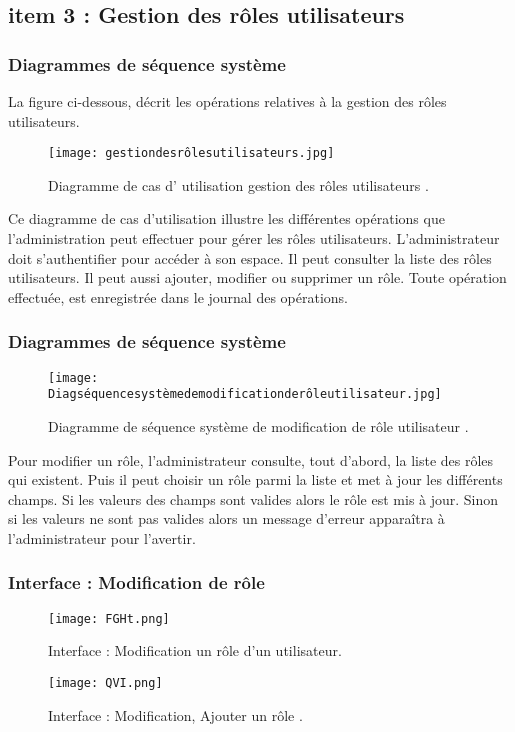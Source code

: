 \subsection{item 3 : Gestion des rôles utilisateurs}
\subsubsection{Diagrammes de séquence système }

La figure ci-dessous, décrit les opérations relatives à la gestion des rôles utilisateurs.
\begin{figure}[ht]
	\centering
	\texttt{[image: gestiondesrôlesutilisateurs.jpg]}
	\caption{Diagramme de cas d' utilisation gestion des rôles utilisateurs .}
	\label{fig:Diagramme de cas d utilisation gestion des rôles utilisateurs }
\end{figure}
\FloatBarrier
Ce diagramme de cas d’utilisation illustre les différentes opérations que l’administration peut effectuer pour gérer les rôles utilisateurs. L’administrateur doit s’authentifier
pour accéder à son espace. Il peut consulter la liste des rôles utilisateurs. Il peut aussi
ajouter, modifier ou supprimer un rôle. Toute opération effectuée, est enregistrée dans le
journal des opérations.
\clearpage
\subsubsection{Diagrammes de séquence système }


\begin{figure}[ht]
	\centering
	\texttt{[image: Diagséquencesystèmedemodificationderôleutilisateur.jpg]}
	\caption{Diagramme de séquence système de modification de rôle utilisateur .}
	\label{fig:Diagramme de séquence système de modification de rôle utilisateur }
\end{figure}
\FloatBarrier

Pour modifier un rôle, l’administrateur consulte, tout d’abord, la liste des rôles qui
existent. Puis il peut choisir un rôle parmi la liste et met à jour les différents champs. Si
les valeurs des champs sont valides alors le rôle est mis à jour. Sinon si les valeurs ne sont
pas valides alors un message d’erreur apparaîtra à l’administrateur pour l’avertir.
\clearpage
\subsubsection{ Interface : Modification de rôle  }
\begin{figure}[ht]
	\centering
	\texttt{[image: FGHt.png]}
	\caption{Interface : Modification un rôle d'un utilisateur.}
	\label{fig:Modification de rôle1}
\end{figure}
\FloatBarrier
\begin{figure}[ht]
	\centering
	\texttt{[image: QVI.png]}
	\caption{Interface : Modification, Ajouter un rôle .}
	\label{fig:2 }
\end{figure}
\FloatBarrier


